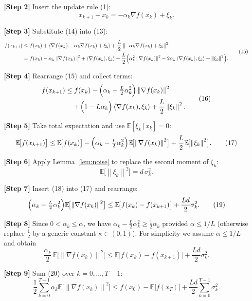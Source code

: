 \documentclass[11pt]{article}
\newcommand{\E}{\mathbb{E}}
\newcommand{\norm}[1]{\left\|#1\right\|}
\newcommand{\ip}[2]{\left\langle #1,#2\right\rangle}
\begin{document}
\noindent\textbf{[Step 2]} Insert the update rule (1):
\[
x_{k+1}-x_k=-\alpha_k\nabla f(x_k)+\xi_k .
\tag{14}
\]

\noindent\textbf{[Step 3]} Substitute (14) into (13):
\[
\begin{aligned}
f(x_{k+1}) &\le f(x_k)
            +\ip{\nabla f(x_k)}{-\alpha_k\nabla f(x_k)+\xi_k}
            +\frac{L}{2}\norm{-\alpha_k\nabla f(x_k)+\xi_k}^2   \\
           &= f(x_k)-\alpha_k\norm{\nabla f(x_k)}^2
              +\ip{\nabla f(x_k)}{\xi_k}
              +\frac{L}{2}\Bigl(\alpha_k^2\norm{\nabla f(x_k)}^2
                               -2\alpha_k\ip{\nabla f(x_k)}{\xi_k}
                               +\norm{\xi_k}^2\Bigr) .
\end{aligned}
\tag{15}
\]

\noindent\textbf{[Step 4]} Rearrange (15) and collect terms:
\[
\begin{aligned}
f(x_{k+1}) &\le f(x_k)
            -\Bigl(\alpha_k-\tfrac{L}{2}\alpha_k^2\Bigr)\norm{\nabla f(x_k)}^2 \\
           &\quad +\Bigl(1-L\alpha_k\Bigr)\ip{\nabla f(x_k)}{\xi_k}
            +\frac{L}{2}\norm{\xi_k}^2 .
\end{aligned}
\tag{16}
\]

\noindent\textbf{[Step 5]} Take total expectation and use
$\E[\xi_k\,|\,x_k]=0$:
\[
\E\!\bigl[f(x_{k+1})\bigr]\le
\E\!\bigl[f(x_k)\bigr]
-\Bigl(\alpha_k-\tfrac{L}{2}\alpha_k^2\Bigr)
   \E\!\bigl[\norm{\nabla f(x_k)}^2\bigr]
+\frac{L}{2}\E\!\bigl[\norm{\xi_k}^2\bigr] .
\tag{17}
\]

\noindent\textbf{[Step 6]} Apply Lemma~\ref{lem:noise} to replace the
second moment of $\xi_k$:
\[
\E\!\bigl[\norm{\xi_k}^2\bigr]=d\,\sigma_k^2 .
\tag{18}
\]

\noindent\textbf{[Step 7]} Insert (18) into (17) and rearrange:
\[
\Bigl(\alpha_k-\tfrac{L}{2}\alpha_k^2\Bigr)
   \E\!\bigl[\norm{\nabla f(x_k)}^2\bigr]
\le
\E\!\bigl[f(x_k)-f(x_{k+1})\bigr]
+\frac{L d}{2}\sigma_k^2 .
\tag{19}
\]

\noindent\textbf{[Step 8]} Since $0<\alpha_k\le \alpha$, we have
$\alpha_k-\tfrac{L}{2}\alpha_k^2\ge \tfrac12\alpha_k$ provided
$\alpha\le 1/L$ (otherwise replace $\tfrac12$ by a generic constant
$\kappa\in(0,1)$).  For simplicity we assume $\alpha\le 1/L$ and obtain
\[
\frac{\alpha_k}{2}\,
\E\!\bigl[\norm{\nabla f(x_k)}^2\bigr]
\le
\E\!\bigl[f(x_k)-f(x_{k+1})\bigr]
+\frac{L d}{2}\sigma_k^2 .
\tag{20}
\]

\noindent\textbf{[Step 9]} Sum (20) over $k=0,\dots,T-1$:
\[
\frac12\sum_{k=0}^{T-1}\alpha_k
   \E\!\bigl[\norm{\nabla f(x_k)}^2\bigr]
\le
f(x_0)-\E\!\bigl[f(x_T)\bigr]
+\frac{L d}{2}\sum_{k=0}^{T-1}\sigma_k^2 .
\tag{21}
\]
\end{document}

